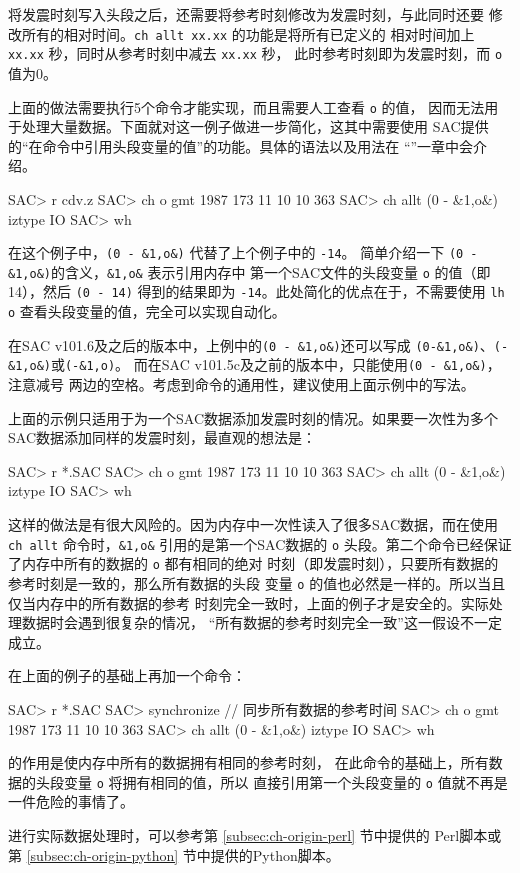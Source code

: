 将发震时刻写入头段之后，还需要将参考时刻修改为发震时刻，与此同时还要
修改所有的相对时间。\texttt{ch allt xx.xx} 的功能是将所有已定义的
相对时间加上 \texttt{xx.xx} 秒，同时从参考时刻中减去 \texttt{xx.xx} 秒，
此时参考时刻即为发震时刻，而 \texttt{o} 值为0。

上面的做法需要执行5个命令才能实现，而且需要人工查看 \texttt{o} 的值，
因而无法用于处理大量数据。下面就对这一例子做进一步简化，这其中需要使用
SAC提供的``在命令中引用头段变量的值''的功能。具体的语法以及用法在
``''一章中会介绍。
\begin{SACCode}
SAC> r cdv.z
SAC> ch o gmt 1987 173 11 10 10 363
SAC> ch allt (0 - &1,o&) iztype IO
SAC> wh
\end{SACCode}
在这个例子中，\verb|(0 - &1,o&)| 代替了上个例子中的 \texttt{-14}。
简单介绍一下 \verb|(0 - &1,o&)|的含义，\verb|&1,o&| 表示引用内存中
第一个SAC文件的头段变量 \texttt{o} 的值（即14），然后 \verb|(0 - 14)|
得到的结果即为 \texttt{-14}。此处简化的优点在于，不需要使用 \texttt{lh o}
查看头段变量的值，完全可以实现自动化。

\begin{note}
在SAC v101.6及之后的版本中，上例中的\verb|(0 - &1,o&)|还可以写成
\verb|(0-&1,o&)|、\verb|(-&1,o&)|或\verb|(-&1,o)|。
而在SAC v101.5c及之前的版本中，只能使用\verb|(0 - &1,o&)|，注意减号
两边的空格。考虑到命令的通用性，建议使用上面示例中的写法。
\end{note}

上面的示例只适用于为一个SAC数据添加发震时刻的情况。如果要一次性为多个
SAC数据添加同样的发震时刻，最直观的想法是：
\begin{SACCode}
SAC> r *.SAC
SAC> ch o gmt 1987 173 11 10 10 363
SAC> ch allt (0 - &1,o&) iztype IO
SAC> wh
\end{SACCode}
这样的做法是有很大风险的。因为内存中一次性读入了很多SAC数据，而在使用
\verb|ch allt| 命令时，\verb|&1,o&| 引用的是第一个SAC数据的 \texttt{o}
头段。第二个命令已经保证了内存中所有的数据的 \texttt{o} 都有相同的绝对
时刻（即发震时刻），只要所有数据的参考时刻是一致的，那么所有数据的头段
变量 \texttt{o} 的值也必然是一样的。所以当且仅当内存中的所有数据的参考
时刻完全一致时，上面的例子才是安全的。实际处理数据时会遇到很复杂的情况，
``所有数据的参考时刻完全一致''这一假设不一定成立。

在上面的例子的基础上再加一个命令：
\begin{SACCode}
SAC> r *.SAC
SAC> synchronize            // 同步所有数据的参考时间
SAC> ch o gmt 1987 173 11 10 10 363
SAC> ch allt (0 - &1,o&) iztype IO
SAC> wh
\end{SACCode}
 的作用是使内存中所有的数据拥有相同的参考时刻，
在此命令的基础上，所有数据的头段变量 \texttt{o} 将拥有相同的值，所以
直接引用第一个头段变量的 \texttt{o} 值就不再是一件危险的事情了。

进行实际数据处理时，可以参考第 \ref{subsec:ch-origin-perl} 节中提供的
Perl脚本或第 \ref{subsec:ch-origin-python} 节中提供的Python脚本。
